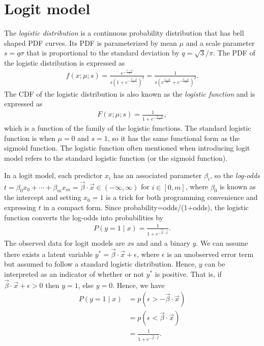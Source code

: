 \section{Logit model}
The \textit{logistic distribution} is a continuous probability distribution that has bell shaped PDF curves. Its PDF is parameterized by mean $\mu$ and a scale parameter $s=q\sigma$ that is proportional to the standard deviation by $q=\sqrt{3}/\pi$. The PDF of the logistic distribution is expressed as 
\begin{align*}
f(x;\mu;s)=\frac{e^{-\frac{x-\mu}{s}}}{s(1+e^{-\frac{x-\mu}{s}})^2}=\frac{1}{s(e^{\frac{x-\mu}{2s}}+e^{-\frac{x-\mu}{2s}})^2}.
\end{align*}
The CDF of the logistic distribution is also known as the \textit{logistic function} and is expressed as 
\begin{align*}
F(x;\mu;s)=\frac{1}{1+e^{-\frac{x-\mu}{s}}},
\end{align*}
which is a function of the family of the logistic functions. The standard logistic function is when $\mu=0$ and $s=1$, so it has the same functional form as the sigmoid function. The logistic function often mentioned when introducing logit model refers to the standard logistic function (or the sigmoid function). 

In a logit model, each predictor $x_i$ has an associated parameter $\beta_i$, so the \textit{log-odds} $t=\beta_0 x_0+\cdots+\beta_m x_m = \vec{\beta}\cdot \vec{x} \in (-\infty,\infty)$ for $i\in [0,m]$, where $\beta_0$ is known as the intercept and setting $x_0=1$ is a trick for both programming convenience and expressing $t$ in a compact form. Since probability=odds/(1+odds), the logistic function converts the log-odds into probabilities by 
\begin{align*}
P(y=1\mid x) = \frac{1}{1+e^{-\vec{\beta}\cdot \vec{x}}}.
\end{align*}
The observed data for logit models are $x$s and and a binary $y$. We can assume there exists a latent variable $y^*=\vec{\beta}\cdot \vec{x}+\epsilon$, where $\epsilon$ is an unobserved error term but assumed to follow a standard logistic distribution. Hence, $y$ can be interpreted as an indicator of whether or not $y^*$ is positive. That is, if $\vec{\beta}\cdot \vec{x}+\epsilon >0$ then $y=1$, else $y=0$. Hence, we have 
\begin{align*}
P(y=1\mid x) &= p(\epsilon>-\vec{\beta}\cdot \vec{x}) \\
&= p(\epsilon<\vec{\beta}\cdot \vec{x}) \\
&= \frac{1}{1+e^{-\vec{\beta}\cdot \vec{x}}}.
\end{align*}

